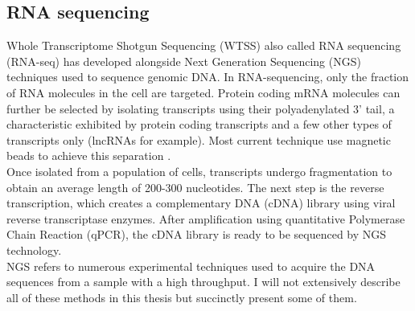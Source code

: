      \subsection{RNA sequencing}
     Whole Transcriptome Shotgun Sequencing (WTSS) also called RNA sequencing (RNA-seq) \citep{morin08,wang09} has developed alongside Next Generation Sequencing (NGS) techniques used to sequence genomic DNA. In RNA-sequencing, only the fraction of RNA molecules in the cell are targeted. Protein coding mRNA molecules can further be selected by isolating transcripts using their polyadenylated 3' tail, a characteristic exhibited by protein coding transcripts and a few other types of transcripts only (lncRNAs for example). Most current technique use magnetic beads to achieve this separation \citep{mortazavi08,morin08}.\\
     
    Once isolated from a population of cells, transcripts undergo fragmentation to obtain an average length of 200-300 nucleotides. The next step is the reverse transcription, which creates a complementary DNA (cDNA) library using viral reverse transcriptase enzymes. After amplification using quantitative Polymerase Chain Reaction (qPCR), the cDNA library is ready to be sequenced by NGS technology.\\
    
    NGS refers to numerous experimental techniques used to acquire the DNA sequences from a sample with a high throughput. I will not extensively describe all of these methods in this thesis but succinctly present some of them. 
    
